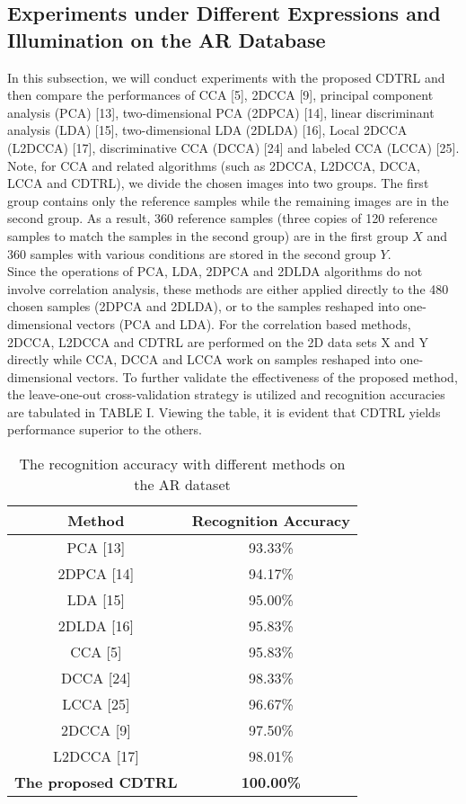 \documentclass[journal]{IEEEtran}
\begin{document}
\subsection{Experiments under Different Expressions and Illumination on the AR Database}
In this subsection, we will conduct experiments with the proposed CDTRL and then compare the performances of CCA [5], 2DCCA [9], principal component analysis (PCA) [13], two-dimensional PCA (2DPCA) [14], linear discriminant analysis (LDA) [15], two-dimensional LDA (2DLDA) [16], Local 2DCCA (L2DCCA) [17], discriminative CCA (DCCA) [24] and labeled CCA (LCCA) [25]. Note, for CCA and related algorithms (such as 2DCCA, L2DCCA, DCCA, LCCA and CDTRL), we divide the chosen images into two groups. The first group contains only the reference samples while the remaining images are in the second group. As a result, 360 reference samples (three copies of 120 reference samples to match the samples in the second group) are in the first group $X$ and 360 samples with various conditions are stored in the second group $Y$.\\\indent Since the operations of PCA, LDA, 2DPCA and 2DLDA algorithms do not involve correlation analysis, these methods are either applied directly to the 480 chosen samples (2DPCA and 2DLDA), or to the samples reshaped into one-dimensional vectors (PCA and LDA). For the correlation based methods, 2DCCA, L2DCCA and CDTRL are performed on the 2D data sets X and Y directly while CCA, DCCA and LCCA work on samples reshaped into one-dimensional vectors. To further validate the effectiveness of the proposed method, the leave-one-out cross-validation strategy is utilized and recognition accuracies are tabulated in TABLE I. Viewing the table, it is evident that CDTRL yields performance superior to the others.
\vspace*{-10pt}
\begin{table}[h]
\normalsize
\renewcommand{\arraystretch}{0.75}
\caption{\normalsize{The recognition accuracy with different methods on the AR dataset}}
\setlength{\abovecaptionskip}{0pt}
\setlength{\belowcaptionskip}{10pt}
\centering
\tabcolsep 0.1in
\begin{tabular}{cc}
\hline
\hline
Method & Recognition Accuracy\\
\hline
PCA [13]  &93.33\%\\
2DPCA [14]  &94.17\%\\
LDA [15]  &95.00\%\\
2DLDA [16]  &95.83\%\\
CCA [5]  &95.83\%\\
DCCA [24]  &98.33\%\\
LCCA [25]  &96.67\%\\
2DCCA [9]  &97.50\%\\
L2DCCA [17]  &98.01\%\\
\textbf{The proposed CDTRL}  &\textbf{100.00\%}\\
\hline
\hline
\end{tabular}
\end{table}
\end{document}

